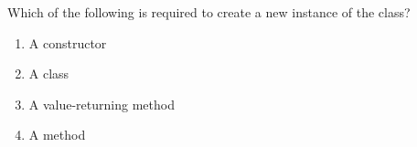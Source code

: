 \question
Which of the following is required to create a new instance of the class?

\begin{enumerate}
\item A constructor
\item A class
\item A value-returning method
\item A \lstinline@None@ method
\end{enumerate}

